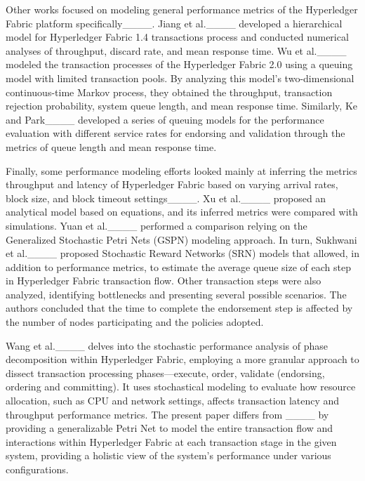 Other works focused on modeling general performance metrics of the Hyperledger Fabric platform specifically____. 
Jiang et al.____ developed a hierarchical model for Hyperledger Fabric 1.4 transactions process and conducted numerical analyses of throughput, discard rate, and mean response time.
Wu et al.____ modeled the transaction processes of the Hyperledger Fabric 2.0 using a queuing model with limited transaction pools. By analyzing this model's two-dimensional continuous-time Markov process, they obtained the throughput, transaction rejection probability, system queue length, and mean response time.
Similarly, Ke and Park____ developed a series of queuing models for the performance evaluation with different service rates for endorsing and validation through the metrics of queue length and mean response time.

Finally, some performance modeling efforts looked mainly at inferring the metrics throughput and latency of Hyperledger Fabric based on varying arrival rates, block size, and block timeout settings____. 
Xu et al.____ proposed an analytical model based on equations, and its inferred metrics were compared with simulations. 
%
Yuan et al.____ performed a comparison relying on the Generalized Stochastic Petri Nets (GSPN) modeling approach.
In turn, Sukhwani et al.____ proposed Stochastic Reward Networks (SRN) models that allowed, in addition to performance metrics, to estimate the average queue size of each step in Hyperledger Fabric transaction flow. Other transaction steps were also analyzed, identifying bottlenecks and presenting several possible scenarios. 
The authors concluded that the time to complete the endorsement step is affected by the number of nodes participating and the policies adopted.

Wang et al.____ delves into the stochastic performance analysis of phase decomposition within Hyperledger Fabric, employing a more granular approach to dissect transaction processing phases—execute, order, validate (endorsing, ordering and committing). It uses stochastical modeling to evaluate how resource allocation, such as CPU and network settings, affects transaction latency and throughput performance metrics. The present paper differs from ____ by providing a generalizable Petri Net to model the entire transaction flow and interactions within Hyperledger Fabric at each transaction stage in the given system, providing a holistic view of the system's performance under various configurations.


